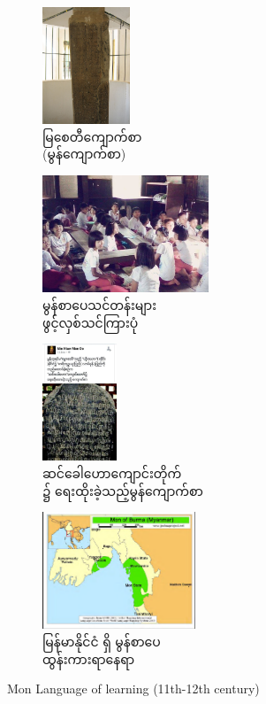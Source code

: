 \documentclass[conference]{IEEEtran}
\begin{document}
\begin{figure}[h!]
  \centering
  \begin{subfigure}[b]{0.4\linewidth}
    \includegraphics[width=\linewidth, height=3.5cm]{./fig/myasadi.jpg}
    \caption{{\padauktext မြစေတီကျောက်စာ \\ (မွန်ကျောက်စာ)}}
  \end{subfigure}
  \begin{subfigure}[b]{0.4\linewidth}
    \includegraphics[width=\linewidth, height=3.5cm]{./fig/monsarpay.jpg}
    \caption{{\padauktext မွန်စာပေသင်တန်းများ\\ဖွင့်လှစ်သင်ကြားပုံ}}
  \end{subfigure}
  \begin{subfigure}[b]{0.4\linewidth}
    \includegraphics[width=\linewidth, height=3.5cm]{./fig/bagan.jpg}
    \caption{{\padauktext ဆင်ခေါဟောကျောင်းတိုက်\\၌ ရေးထိုးခဲ့သည့်မွန်ကျောက်စာ}}
  \end{subfigure}
  \begin{subfigure}[b]{0.4\linewidth}
    \includegraphics[width=\linewidth, height=3.5cm]{./fig/mon-bruma.png}
    \caption{{\padauktext မြန်မာနိုင်ငံ ရှိ မွန်စာပေ \\ ထွန်းကားရာနေရာ}}
  \end{subfigure}
  \caption{Mon Language of learning (11th-12th century)}
  \label{fig:mon}
\end{figure}
\end{document}

